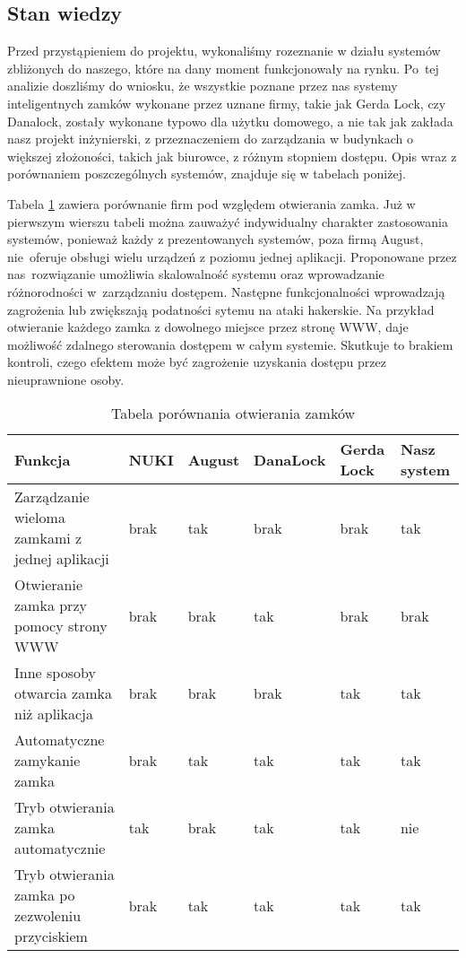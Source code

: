 \documentclass[twoside,10pt]{article}
\begin{document}
\subsection{Stan wiedzy}\label{sec:Stan wiedzy}
Przed przystąpieniem do projektu, wykonaliśmy rozeznanie w działu systemów zbliżonych do naszego, które na dany moment funkcjonowały na rynku. Po~tej analizie doszliśmy do wniosku, że wszystkie poznane przez nas systemy inteligentnych zamków wykonane przez uznane firmy, takie jak Gerda Lock, czy Danalock, zostały wykonane typowo dla użytku domowego, a nie tak jak zakłada nasz projekt inżynierski, z  przeznaczeniem do zarządzania w budynkach o większej złożoności, takich jak biurowce, z różnym stopniem dostępu. Opis wraz z porównaniem poszczególnych systemów, znajduje się w tabelach poniżej.

Tabela \ref{tab:porownanie1} zawiera porównanie firm pod względem otwierania zamka. Już w pierwszym wierszu tabeli można zauważyć indywidualny charakter zastosowania systemów, ponieważ każdy z prezentowanych systemów, poza firmą August, nie~oferuje obsługi wielu urządzeń z poziomu jednej aplikacji. Proponowane przez nas~rozwiązanie umożliwia skalowalność systemu oraz wprowadzanie różnorodności w~zarządzaniu dostępem. Następne funkcjonalności wprowadzają zagrożenia lub zwiększają podatności sytemu na ataki hakerskie. Na przykład otwieranie każdego zamka z dowolnego miejsce przez stronę WWW, daje możliwość zdalnego sterowania dostępem w całym systemie. Skutkuje to brakiem kontroli, czego efektem może być zagrożenie uzyskania dostępu przez nieuprawnione osoby.
\newpage
\begin{longtable}[!ht]{|m{5cm}|m{1.5cm}|m{1.6cm}|m{1.9cm}|m{2cm}|m{2cm}|} 
\caption{Tabela porównania otwierania zamków}
\label{tab:porownanie1}\\
\hline
Funkcja & NUKI\cite{NUKI} & August\cite{August} & DanaLock\cite{DanaLock} &
Gerda Lock\cite{GerdaLock} & 
Nasz system  \\ \hline
Zarządzanie wieloma zamkami z jednej aplikacji
& brak & tak & brak & brak & tak \\ \hline
Otwieranie zamka przy pomocy strony WWW
& brak & brak & tak & brak & brak \\ \hline
Inne sposoby otwarcia zamka niż aplikacja
& brak & brak & brak & tak & tak \\ \hline
Automatyczne zamykanie zamka
& brak & tak & tak & tak & tak \\ \hline
Tryb otwierania zamka automatycznie
& tak& brak & tak & tak & nie \\ \hline
Tryb otwierania zamka po zezwoleniu przyciskiem
& brak & tak & tak & tak & tak \\ \hline
\end{longtable}
\end{document}

